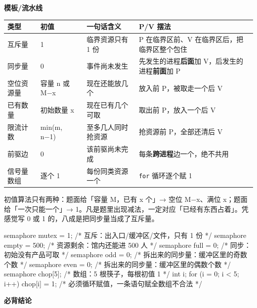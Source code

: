 \documentclass[10pt,a4paper]{ctexart}
\begin{document}
\textbf{模板/流水线}

\begin{center}\small
\begin{tabularx}{\linewidth}{@{}ll>{\raggedright\arraybackslash}X>{\raggedright\arraybackslash}X@{}}
\toprule
类型 & 初值 & 一句话含义 & P/V 摆法 \\
\midrule
互斥量 & 1 & 临界资源只有 1 份 & P 在临界区前、V 在临界区后，把临界区整个包住 \\
同步量 & 0 & 事件尚未发生 & 先发生的进程\textbf{后面}加 V，后发生的进程\textbf{前面}加 P \\
空位资源量 & 容量 n 或 M−x & 现在还能放几个 & 放入前 P，被取走一个后 V \\
已有数量 & 初始数量 x & 现在已有几个可取 & 取出前 P，放入一个后 V \\
限流计数 & min(m, n−1) & 至多几人同时抢资源 & 抢资源前 P，全部还清后 V \\
前驱边 & 0 & 该前驱尚未完成 & 每条\textbf{跨进程}边一个，绝不共用 \\
信号量数组 & 逐个 1 & 每份同类资源一个 & \texttt{for} 循环逐个赋 1 \\
\bottomrule
\end{tabularx}
\end{center}

初值算法只有两种：题面给「容量 M，已有 x 个」→ 空位 M−x、满位 x；题面给「一次只能一个」→ 1。凡是题里出现减法，一定对应「已经有东西占着」。凭感觉写 0 或 1 的，八成是把同步量当成了互斥量。

\begin{codebox}
semaphore mutex = 1;          /* 互斥：出入口/缓冲区/文件，只有 1 份 */
semaphore empty = 500;        /* 资源剩余：馆内还能进 500 人 */
semaphore full  = 0;          /* 同步：初始没有产品可取 */
semaphore odd   = 0;          /* 拆出来的同步量：缓冲区里的奇数个数 */
semaphore even  = 0;          /* 拆出来的同步量：缓冲区里的偶数个数 */
semaphore chop[5];            /* 数组：5 根筷子，每根初值 1 */
int i;
for (i = 0; i < 5; i++) chop[i] = 1;   /* 必须循环赋值，一条语句赋全数组不合法 */
\end{codebox}




\textbf{必背结论}
\end{document}
